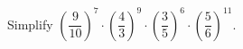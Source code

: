 Simplify $\left(\dfrac{9}{10}\right)^7\cdot\left(\dfrac43\right)^9\cdot\left(\dfrac35\right)^6\cdot\left(\dfrac56\right)^{11}$.
